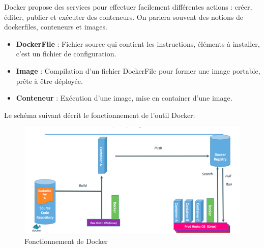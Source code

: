 \begin{onehalfspace}
Docker propose des services pour effectuer facilement différentes actions : créer, éditer, publier et exécuter des conteneurs. On parlera souvent des notions de dockerfiles, conteneurs et  images.

\begin{itemize}
\item \textbf{DockerFile} : Fichier source qui contient les instructions, éléments à installer, c’est un fichier de configuration.
\item \textbf{Image} : Compilation d’un fichier DockerFile pour former une image portable, prête à être déployée.
\item \textbf{Conteneur} : Exécution d’une image, mise en container d’une image.
\end{itemize}


Le schéma suivant décrit le fonctionnement de l'outil Docker: 
\begin{figure}[H]
\centering
\includegraphics [scale=0.6]{chapitre2/assets/utilisation.png}
\caption{Fonctionnement de Docker}
\end{figure}

\end{onehalfspace}
\label{table:} %
